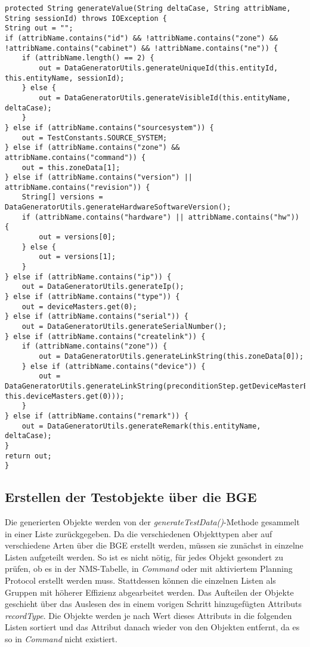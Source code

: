 \newpage
\begin{lstlisting}[caption=Methode zur Wertegenerierung, label=generateValue,style=Javastyle,basicstyle=\fontsize{10}{11}\ttfamily]
protected String generateValue(String deltaCase, String attribName, String sessionId) throws IOException {
String out = "";
if (attribName.contains("id") && !attribName.contains("zone") && !attribName.contains("cabinet") && !attribName.contains("ne")) {
    if (attribName.length() == 2) {
        out = DataGeneratorUtils.generateUniqueId(this.entityId, this.entityName, sessionId);
    } else {
        out = DataGeneratorUtils.generateVisibleId(this.entityName, deltaCase);
    }
} else if (attribName.contains("sourcesystem")) {
    out = TestConstants.SOURCE_SYSTEM;
} else if (attribName.contains("zone") && attribName.contains("command")) {
    out = this.zoneData[1];
} else if (attribName.contains("version") || attribName.contains("revision")) {
    String[] versions = DataGeneratorUtils.generateHardwareSoftwareVersion();
    if (attribName.contains("hardware") || attribName.contains("hw")) {
        out = versions[0];
    } else {
        out = versions[1];
    }
} else if (attribName.contains("ip")) {
    out = DataGeneratorUtils.generateIp();
} else if (attribName.contains("type")) {
    out = deviceMasters.get(0);
} else if (attribName.contains("serial")) {
    out = DataGeneratorUtils.generateSerialNumber();
} else if (attribName.contains("createlink")) {
    if (attribName.contains("zone")) {
        out = DataGeneratorUtils.generateLinkString(this.zoneData[0]);
    } else if (attribName.contains("device")) {
        out = DataGeneratorUtils.generateLinkString(preconditionStep.getDeviceMasterElid(sessionId, this.deviceMasters.get(0)));
    }
} else if (attribName.contains("remark")) {
    out = DataGeneratorUtils.generateRemark(this.entityName, deltaCase);
}
return out;
}
\end{lstlisting}

\subsection{Erstellen der Testobjekte über die BGE}\label{subsec:creatingObjectsBGE}
Die generierten Objekte werden von der \textit{generateTestData()}-Methode gesammelt in einer Liste zurückgegeben. 
Da die verschiedenen Objekttypen aber auf verschiedene Arten über die \ac{BGE} erstellt werden, müssen sie zunächst in einzelne Listen aufgeteilt werden. So ist es nicht nötig, für jedes Objekt gesondert zu prüfen, ob es in der \ac{NMS}-Tabelle, in \textit{Command} oder mit aktiviertem Planning Protocol erstellt werden muss. Stattdessen können die einzelnen Listen als Gruppen mit höherer Effizienz abgearbeitet werden. Das Aufteilen der Objekte geschieht über das Auslesen des in einem vorigen Schritt hinzugefügten Attributs \textit{recordType}. Die Objekte werden je nach Wert dieses Attributs in die folgenden Listen sortiert und das Attribut danach wieder von den Objekten entfernt, da es so in \textit{Command} nicht existiert.


